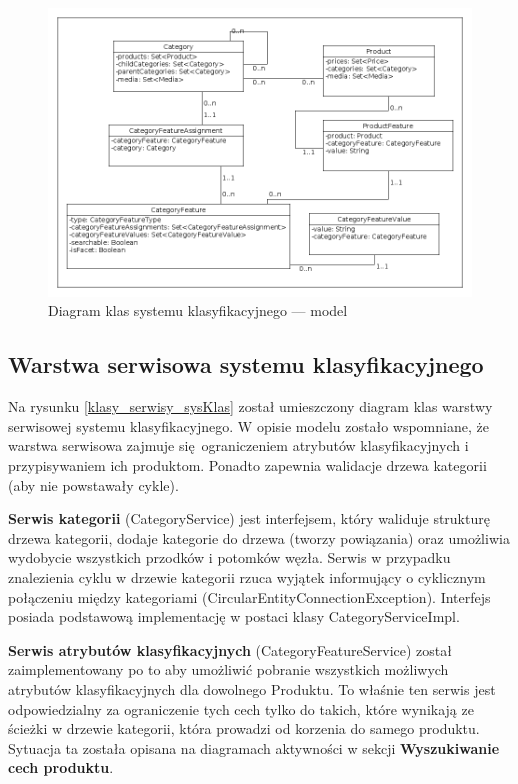 \begin{figure}
	\begin{center}
		\includegraphics[scale=0.4]{klasy_model_sysKlas.png}
	\end{center}
	\caption{{\color{black}Diagram klas systemu klasyfikacyjnego — model}} \label{klasy_model_sysKlas}
\end{figure}

\subsection{Warstwa serwisowa systemu klasyfikacyjnego}
Na rysunku \ref{klasy_serwisy_sysKlas} został umieszczony diagram klas warstwy serwisowej systemu klasyfikacyjnego. W opisie modelu zostało wspomniane, że warstwa serwisowa zajmuje się ograniczeniem atrybutów klasyfikacyjnych i przypisywaniem ich produktom. Ponadto zapewnia walidacje drzewa kategorii (aby nie powstawały cykle).

\noindent
\textbf{Serwis kategorii} (CategoryService) jest interfejsem, który waliduje strukturę drzewa kategorii, dodaje kategorie do drzewa (tworzy powiązania) oraz umożliwia wydobycie wszystkich przodków i potomków węzła. Serwis w przypadku znalezienia cyklu w drzewie kategorii rzuca wyjątek informujący o cyklicznym połączeniu między kategoriami (CircularEntityConnectionException). Interfejs posiada podstawową implementację w postaci klasy CategoryServiceImpl. 

\noindent
\textbf{Serwis atrybutów klasyfikacyjnych} (CategoryFeatureService) został zaimplementowany po to aby umożliwić pobranie wszystkich możliwych atrybutów klasyfikacyjnych dla dowolnego Produktu. To właśnie ten serwis jest odpowiedzialny za ograniczenie tych cech tylko do takich, które wynikają ze ścieżki w drzewie kategorii, która prowadzi od korzenia do samego produktu. Sytuacja ta została opisana na diagramach aktywności w sekcji \textbf{Wyszukiwanie cech produktu}.

